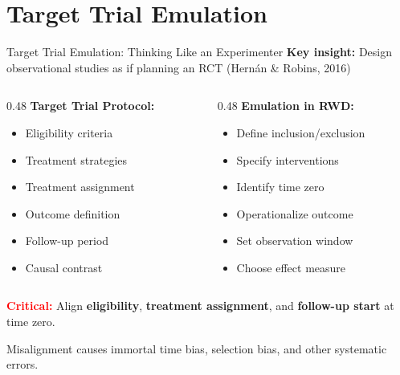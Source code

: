 \documentclass[aspectratio=169]{beamer}
\begin{document}
\section{Target Trial Emulation}

\begin{frame}{Target Trial Emulation: Thinking Like an Experimenter}
  \small
  \textbf{Key insight:} Design observational studies as if planning an RCT (Hern{\'a}n \& Robins, 2016)
  \vspace{0.5em}

  \begin{columns}[T]
    \begin{column}{0.48\textwidth}
      \textbf{Target Trial Protocol:}
      \begin{itemize}
        \item Eligibility criteria
        \item Treatment strategies
        \item Treatment assignment
        \item Outcome definition
        \item Follow-up period
        \item Causal contrast
      \end{itemize}
    \end{column}
    \begin{column}{0.48\textwidth}
      \textbf{Emulation in RWD:}
      \begin{itemize}
        \item Define inclusion/exclusion
        \item Specify interventions
        \item Identify time zero
        \item Operationalize outcome
        \item Set observation window
        \item Choose effect measure
      \end{itemize}
    \end{column}
  \end{columns}
  \vspace{0.5em}

  \textcolor{red}{\textbf{Critical:}} Align \textbf{eligibility}, \textbf{treatment assignment}, and \textbf{follow-up start} at time zero.
  \vspace{0.3em}

  {\footnotesize Misalignment causes immortal time bias, selection bias, and other systematic errors.}
\end{frame}
\end{document}
